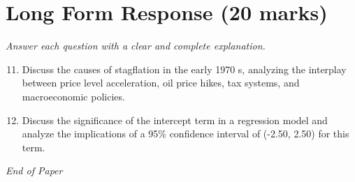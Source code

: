 \documentclass[12pt]{article}
\begin{document}
\section*{Long Form Response (20 marks)}
\textit{Answer each question with a clear and complete explanation.}
\begin{enumerate}[label=\arabic*.]
\setcounter{enumi}{10}
\item Discuss the causes of stagflation in the early 1970 s, analyzing the interplay between price level acceleration, oil price hikes, tax systems, and macroeconomic policies.
\item Discuss the significance of the intercept term in a regression model and analyze the implications of a 95\% confidence interval of (-2.50, 2.50) for this term.
\end{enumerate}

\vfill
\noindent\textit{End of Paper}
\end{document}
